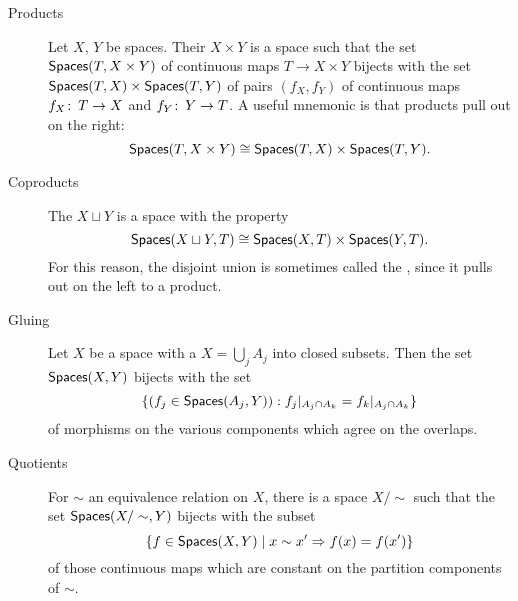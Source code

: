\begin{description}
    \item[Products]
    Let $X$, $Y$ be spaces.
    Their  $X \times Y$ is a space such that the set $\mathsf{Spaces}(T, X \times Y)$ of continuous maps $T \to X \times Y$ bijects with the set $\mathsf{Spaces}(T, X) \times \mathsf{Spaces}(T, Y)$ of pairs $(f_X, f_Y)$ of continuous maps $f_X\colon\thinspace T \to X$ and $f_Y\colon\thinspace Y \to T$.
    A useful mnemonic is that products pull out on the right: \[\mathsf{Spaces}(T, X \times Y) \cong \mathsf{Spaces}(T, X) \times \mathsf{Spaces}(T, Y).\]
    \item[Coproducts]
    The  $X \sqcup Y$ is a space with the property \[\mathsf{Spaces}(X \sqcup Y, T) \cong \mathsf{Spaces}(X, T) \times \mathsf{Spaces}(Y, T).\]
    For this reason, the disjoint union is sometimes called the , since it pulls out on the left to a product.
    \item[Gluing]
    Let $X$ be a space with a  $X = \bigcup_j A_j$ into closed subsets.%
    Then the set $\mathsf{Spaces}(X, Y)$ bijects with the set \[\{(f_j \in \mathsf{Spaces}(A_j, Y)) : f_j|_{A_j \cap A_k} = f_k|_{A_j \cap A_k}\}\] of morphisms on the various components which agree on the overlaps.
    \item[Quotients]
    For $\sim$ an equivalence relation on $X$, there is a space $X / \sim$ such that the set $\mathsf{Spaces}(X / \sim, Y)$ bijects with the subset \[\{f \in \mathsf{Spaces}(X, Y) \mid x \sim x' \Rightarrow f(x) = f(x')\}\] of those continuous maps which are constant on the partition components of $\sim$.

\end{description}
